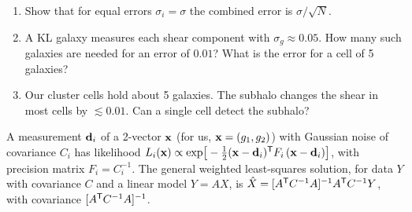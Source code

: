 
\begin{enumerate}
  \item Show that for equal errors $\sigma_i = \sigma$ the combined error is $\sigma/\sqrt N$.
  \item A KL galaxy measures each shear component with $\sigma_g \approx 0.05$. How many such galaxies are needed for
    an error of $0.01$? What is the error for a cell of 5 galaxies?
  \item Our cluster cells hold about 5 galaxies. The subhalo changes the shear in most cells by $\lesssim 0.01$. Can a
    single cell detect the subhalo?
\end{enumerate}



\begin{given}
A measurement $\mathbf{d}_i$ of a 2-vector $\mathbf{x}$ (for us, $\mathbf{x} = (g_1, g_2)$) with Gaussian noise of covariance $C_i$ has
likelihood $L_i(\mathbf{x}) \propto \exp\!\big[-\tfrac12 (\mathbf{x}-\mathbf{d}_i)^{\mathsf{T}} F_i\,(\mathbf{x} - \mathbf{d}_i)\big]$, with precision matrix
$F_i = C_i^{-1}$. The general weighted least-squares solution, for data $Y$ with covariance $C$ and a linear model
$Y = AX$, is $\hat X = [A^{\mathsf{T}} C^{-1} A]^{-1} A^{\mathsf{T}} C^{-1} Y$, with covariance $[A^{\mathsf{T}} C^{-1} A]^{-1}$.
\end{given}


